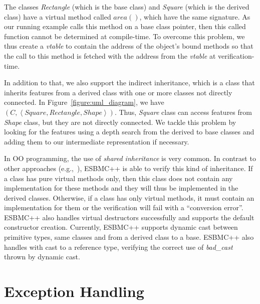 \documentclass[a4paper]{llncs}
\begin{document}
The classes \textit{Rectangle} (which is the base class)
and \textit{Square} (which is the derived class) have a virtual method
called $area\left(\right)$, which have the same signature. As our running example
calls this method on a base class pointer, then this called function
cannot be determined at compile-time. To overcome this problem,
we thus create a \textit{vtable} to contain the address of the object's bound
methods so that the call to this method is fetched with the address from
the \textit{vtable} at verification-time.

In addition to that, we also support the indirect inheritance,
which is a class that inherits features from a derived class with one
or more classes not directly connected. In Figure~\ref{figure:uml_diagram}, we have
$\left(C, \left\langle Square, Rectangle, Shape \right\rangle \right)$.
Thus, \textit{Square} class can access features from \textit{Shape} class,
but they are not directly connected. We tackle this problem by
looking for the features using a depth search from the derived to base classes
and adding them to our intermediate representation if necessary.

In OO programming, the use of \textit{shared inheritance} is very common.
In contrast to other approaches (e.g.,~\cite{Blanc07}), ESBMC++ is able to
verify this kind of inheritance. If a class has pure virtual methods only,
then this class does not contain any implementation for these methods and they will
thus be implemented in the derived classes. Otherwise, if a class has only virtual
methods, it must contain an implementation for them or the verification will fail
with a ``conversion error''. ESBMC++ also handles virtual destructors successfully
and supports the default constructor creation. Currently, ESBMC++
supports dynamic cast between primitive types, same classes and from a derived
class to a base. ESBMC++ also handles with cast to a reference type, verifying the
correct use of \textit{bad\_cast} thrown by dynamic cast.


\section{Exception Handling}
\label{exception-handling}
\end{document}
